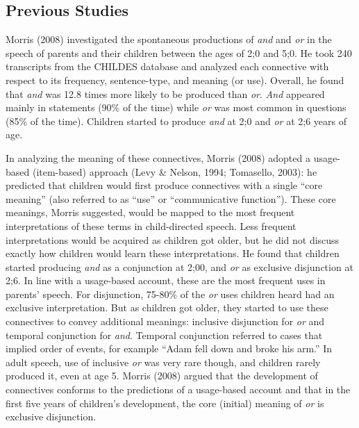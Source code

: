 \documentclass[
  english,
  ,man,floatsintext]{apa6}
\begin{document}
\hypertarget{previous-studies}{%
\subsection{Previous Studies}\label{previous-studies}}

Morris (2008) investigated the spontaneous productions of \emph{and} and \emph{or} in the speech of parents and their children between the ages of 2;0 and 5;0. He took 240 transcripts from the CHILDES database and analyzed each connective with respect to its frequency, sentence-type, and meaning (or use). Overall, he found that \emph{and} was 12.8 times more likely to be produced than \emph{or}. \emph{And} appeared mainly in statements (90\% of the time) while \emph{or} was most common in questions (85\% of the time). Children started to produce \emph{and} at 2;0 and \emph{or} at 2;6 years of age.

In analyzing the meaning of these connectives, Morris (2008) adopted a usage-based (item-based) approach (Levy \& Nelson, 1994; Tomasello, 2003): he predicted that children would first produce connectives with a single ``core meaning'' (also referred to as ``use'' or ``communicative function''). These core meanings, Morris suggested, would be mapped to the most frequent interpretations of these terms in child-directed speech. Less frequent interpretations would be acquired as children got older, but he did not discuss exactly how children would learn these interpretations. He found that children started producing \emph{and} as a conjunction at 2;00, and \emph{or} as exclusive disjunction at 2;6. In line with a usage-based account, these are the most frequent uses in parents' speech. For disjunction, 75-80\% of the \emph{or} uses children heard had an exclusive interpretation. But as children got older, they started to use these connectives to convey additional meanings: inclusive disjunction for \emph{or} and temporal conjunction for \emph{and}. Temporal conjunction referred to cases that implied order of events, for example ``Adam fell down and broke his arm.'' In adult speech, use of inclusive \emph{or} was very rare though, and children rarely produced it, even at age 5. Morris (2008) argued that the development of connectives conforms to the predictions of a usage-based account and that in the first five years of children's development, the core (initial) meaning of \emph{or} is exclusive disjunction.
\end{document}
